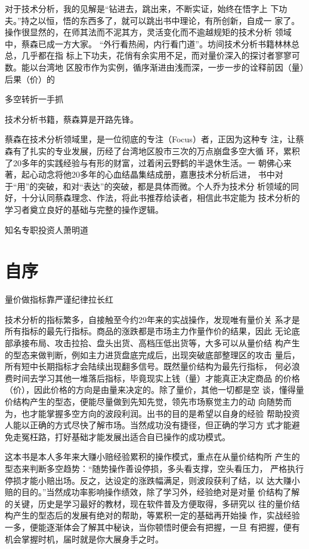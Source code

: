 \documentclass{article}
\begin{document}
对于技术分析，我的见解是“钻进去，跳出来，不断实证，始终在悟字上 下功夫。”持之以恒，悟的东西多了，就可以跳出书中理论，有所创新，自成一 家了。操作很显然的，在师其法而不泥其方，灵活变化而不逾越规矩的技术分析 领域中，蔡森已成一方大家。 “外行看热闹，内行看门道”。坊间技术分析书籍林林总总，几乎都在指 标上下功夫，花俏有余实用不足，而对量价深入的探讨者寥寥可数。能以台湾地 区股市作为实例，循序渐进由浅而深，一步一步的诠释前因（量）后果（价）的

\clearpage

多空转折一手抓

技术分析书籍，蔡森算是开路先锋。

蔡森在技术分析领域里，是一位彻底的专注（Focus）者，正因为这种专 注，让蔡森有了扎实的专业发展，历经了台湾地区股市三次的万点崩盘多空大循 环，累积了20多年的实践经验与有形的财富，过着闲云野鹤的半退休生活。一 朝佛心来著，起心动念将他20多年的心血结晶集结成册，嘉惠技术分析后进， 书中对于“用”的突破，和对“表达”的突破，都是具体而微。个人乔为技术分 析领域的同好，十分认同蔡森理念、作法，将此书推荐给读者，相信此书定能为 技术分析的学习者奠立良好的基础与完整的操作逻辑。

知名专职投资人萧明道

\clearpage

\section{自序}

量价做指标靠严谨纪律拉长红

技术分析的指标繁多，自接触至今约29年来的实战操作，发现唯有量价关 系才是所有指标的最先行指标。商品的涨跌都是市场主力作量作价的结果，因此 无论底部承接布局、攻击拉拾、盘头出货、高档压低出货等，大多可以从量价结 构产生的型态来做判断，例如主力进货盘底完成后，出现突破底部整理区的攻击 量后，所有短中长期指标才会陆续出现翻多信号。既然量价结构为最先行指标， 何必浪费时间去学习其他一堆落后指标，毕竟现实上钱（量）才能真正决定商品 的价格（价），因此价格的方向是由量来决定的。除了量价，其他一切都是空 谈，懂得量价结构产生的型态，便能尽量做到先知先觉，领先市场察觉主力的动 向随势而为，也才能掌握多空方向的波段利润。出书的目的是希望以自身的经验 帮助投资人能以正确的方式尽快了解市场。当然成功没有捷径，但正确的学习方 式才能避免走冤枉路，打好基础才能发展出适合自已操作的成功模式。

这本书是本人多年来大赚小赔经验累积的操作模式，重点在从量价结构所 产生的型态来判断多空趋势：“随势操作善设停损，多头看支撑，空头看压力， 严格执行停损才能小赔出场。反之，达设定的涨跌幅满足，则波段获利了结，以 达大赚小赔的目的。”当然成功率影响操作绩效，除了学习外，经验绝对是对量 价结构了解的关键，历史是学习最好的教材，现在软件普及方便取得，多研究以 往的量价结构产生的型态后的发展有绝对的帮助，等累积一定的基础再开始操 作，实战经验一多，便能逐渐体会了解其中秘诀，当你顿悟时便会有把握，一旦 有把握，便有机会掌握时机，届时就是你大展身手之时。
\end{document}
